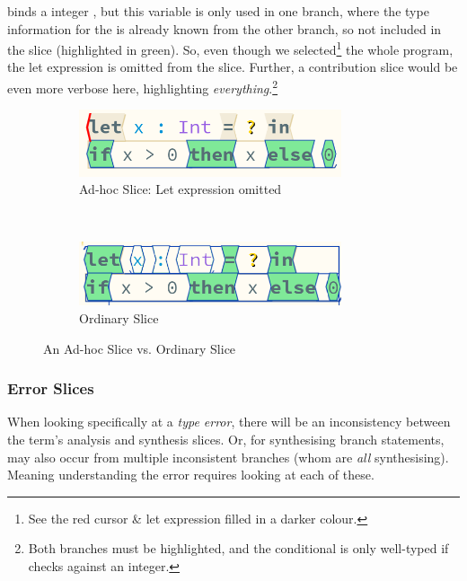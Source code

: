  binds a integer , but this variable is only used in one branch, where the type information for the  is already known from the other branch, so not included in the slice (highlighted in green). So, even though we selected\footnote{See the red cursor \& let expression filled in a darker colour.} the whole program, the let expression is omitted from the slice. Further, a contribution slice would be even more verbose here, highlighting \textit{everything}.\footnote{Both branches must be highlighted, and the conditional is only well-typed if  checks against an integer.}

\begin{figure}
\centering
\begin{subfigure}{0.45\textwidth}
\centering

\includegraphics[width=0.85\textwidth]{Media/Figures/Unused_let}
\caption{Ad-hoc Slice: Let expression omitted}
\end{subfigure}$\qquad$
\begin{subfigure}{0.45\textwidth}
\centering

\includegraphics[width=0.85\textwidth]{Media/Figures/Unused_let_ordinary}
\caption{Ordinary Slice}
\end{subfigure}

\caption{An Ad-hoc Slice vs. Ordinary Slice}
\label{fig:LetSliceOmitted}
\end{figure}


\subsubsection{Error Slices}
When looking specifically at a \textit{type error}, there will be an inconsistency between the term's analysis and synthesis slices. Or, for synthesising branch statements, may also occur from multiple inconsistent branches (whom are \textit{all} synthesising). Meaning understanding the error requires looking at each of these.

